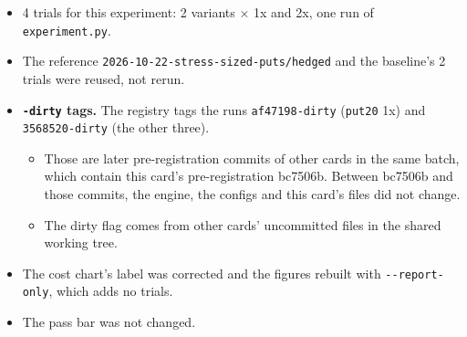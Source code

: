 \documentclass{article}
\begin{document}
\begin{itemize}

\item 4 trials for this experiment: 2 variants \ensuremath{\times} 1x and 2x, one run of \texttt{experiment.\allowbreak{}py}.

\item The reference \texttt{2026-\allowbreak{}10-\allowbreak{}22-\allowbreak{}stress-\allowbreak{}sized-\allowbreak{}puts/\allowbreak{}hedged} and the baseline's 2 trials were reused, not rerun.

\item \textbf{\texttt{-\allowbreak{}dirty} tags.} The registry tags the runs \texttt{af47198-\allowbreak{}dirty} (\texttt{put20} 1x) and \texttt{3568520-\allowbreak{}dirty} (the other three).

\begin{itemize}

\item Those are later pre-registration commits of other cards in the same batch, which contain this card's pre-registration bc7506b. Between bc7506b and those commits, the engine, the configs and this card's files did not change.

\item The dirty flag comes from other cards' uncommitted files in the shared working tree.

\end{itemize}

\item The cost chart's label was corrected and the figures rebuilt with \texttt{-\allowbreak{}-\allowbreak{}report-\allowbreak{}only}, which adds no trials.

\item The pass bar was not changed.

\end{itemize}
\end{document}
